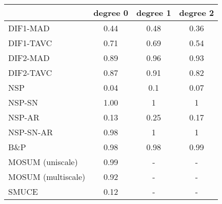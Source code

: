 \begin{tabular}{|l|c|c|c|}
  \hline
 & degree 0 & degree 1 & degree 2 \\ 
  \hline
DIF1-MAD & 0.44 & 0.48 & 0.36 \\ 
  DIF1-TAVC & 0.71 & 0.69 & 0.54 \\ 
  DIF2-MAD & 0.89 & 0.96 & 0.93 \\ 
  DIF2-TAVC & 0.87 & 0.91 & 0.82 \\ 
  NSP & 0.04 & 0.1 & 0.07 \\ 
  NSP-SN & 1.00 & 1 & 1 \\ 
  NSP-AR & 0.13 & 0.25 & 0.17 \\ 
  NSP-SN-AR & 0.98 & 1 & 1 \\ 
  B\&P & 0.98 & 0.98 & 0.99 \\ 
  MOSUM (uniscale) & 0.99 & - & - \\ 
  MOSUM (multiscale) & 0.92 & - & - \\ 
  SMUCE & 0.12 & - & - \\ 
   \hline
\end{tabular}
